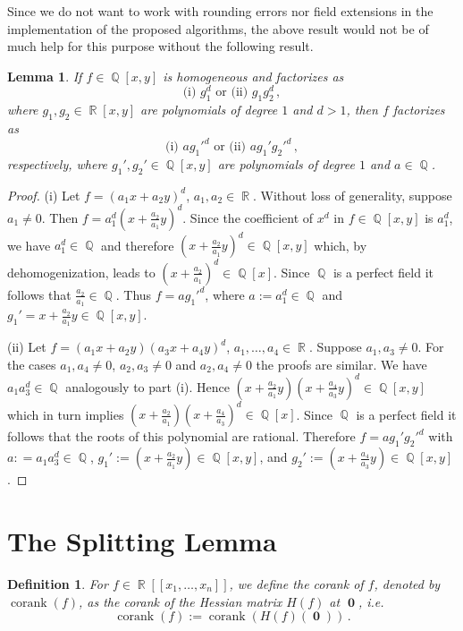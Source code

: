 \documentclass[noend]{amsproc}
\newtheorem{defn}[theorem]{Definition}
\newtheorem{lemma}[theorem]{Lemma}
\theoremstyle{definition}
\DeclareMathOperator{\corank}{corank}
\DeclareMathOperator{\Q}{\mathbb{Q}}
\DeclareMathOperator{\R}{\mathbb{R}}
\DeclareMathOperator{\boldzero}{\mathbf{0}}
\begin{document}
Since we do not want to work with rounding errors nor field extensions in the
implementation of the proposed algorithms, the above result would not be of
much help for this purpose without the following result.

\begin{lemma}\label{x^3}
If $f \in \Q[x,y]$ is homogeneous and factorizes as
\[
\text{(i) } g_1^d \text{ or (ii) } g_1 g_2^d \,,
\]
where $g_1, g_2 \in \R[x,y]$ are polynomials of degree $1$ and $d > 1$, then
$f$ factorizes as
\[
\text{(i) } ag_1'^d \text{ or (ii) } ag_1' g_2'^d \,,
\]
respectively, where $g_1', g_2' \in \Q[x,y]$ are polynomials of degree $1$ and
$a \in \Q$.
\end{lemma}

\begin{proof}

(i) Let $f = (a_1x+a_2y)^d$, $a_1, a_2 \in \R$. Without loss of generality,
suppose $a_1 \neq 0$. Then $f = a_1^d(x+\frac{a_2}{a_1}y)^d$. Since the
coefficient of $x^d$ in $f \in \Q[x,y]$ is $a_1^d$, we have $a_1^d \in \Q$ and
therefore $(x+\frac{a_2}{a_1}y)^d \in \Q[x,y]$ which, by dehomogenization,
leads to $(x+\frac{a_2}{a_1})^d \in \Q[x]$. Since $\Q$ is a perfect field it
follows that $\frac{a_2}{a_1} \in \Q$. Thus $f = ag_1'^d$, where
$a := a_1^d \in \Q$ and $g_1' = x+\frac{a_2}{a_1}y \in \Q[x,y]$.

(ii) Let $f = (a_1x+a_2y)(a_3x+a_4y)^d$, $a_1,\ldots,a_4 \in \R$. Suppose
$a_1,a_3 \neq 0$. For the cases $a_1,a_4 \neq 0$, $a_2,a_3 \neq 0$ and
$a_2,a_4 \neq 0$ the proofs are similar. We have $a_1a_3^d \in \Q$ analogously
to part (i). Hence $(x+\frac{a_2}{a_1}y)(x+\frac{a_4}{a_3}y)^d \in \Q[x,y]$
which in turn implies $(x+\frac{a_2}{a_1})(x+\frac{a_4}{a_3})^d \in \Q[x]$.
Since $\Q$ is a perfect field it follows that the roots of this polynomial are
rational. Therefore $f = ag_1'g_2'^d$ with $a: = a_1a_3^d \in \Q$,
$g_1' := (x+\frac{a_2}{a_1}y) \in \Q[x,y]$, and
$g_2' := (x+\frac{a_4}{a_3}y) \in \Q[x,y]$.
\end{proof}


\section{The Splitting Lemma}\label{TheSplittingLemma}

\begin{defn}
For $f \in \R[[x_1,\ldots,x_n]]$, we define the corank of $f$, denoted by
$\corank(f)$, as the corank of the Hessian matrix $H(f)$ at $\boldzero$, i.e.
\[
\corank(f) := \corank(H(f)(\boldzero)) \,.
\]
\end{defn}
\end{document}

